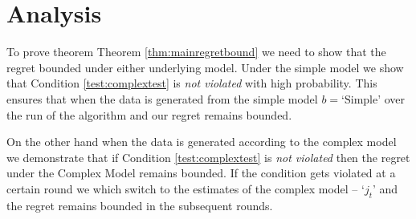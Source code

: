 \section{Analysis}

To prove theorem Theorem \ref{thm:mainregretbound} we need to show that the regret bounded under either underlying model. Under the simple model we show that Condition \eqref{test:complextest} is \emph{not violated} with high probability. This ensures that when the data is generated from the simple model $b = \text{`Simple'}$ over the run of the algorithm and our regret remains bounded.

On the other hand when the data is generated according to the complex model we demonstrate that if Condition \eqref{test:complextest} is \emph{not violated} then the regret under the Complex Model remains bounded. If the condition gets violated at a certain round we which switch to the estimates of the complex model -- `$j_t$' and the regret remains bounded in the subsequent rounds. 



